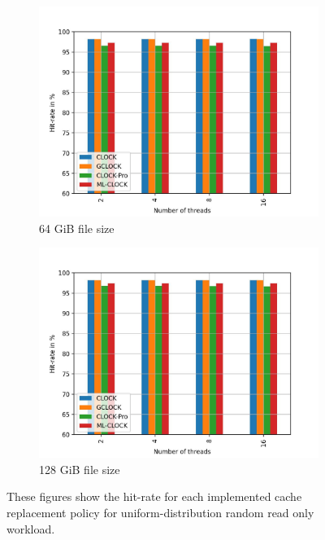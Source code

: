 \documentclass[
	12pt,
	a4paper,
	abstract,
	bibliography=totoc,
	chapterprefix,
	headings=openright,
	numbers=endperiod,
	parskip=half,
	twoside,
]{scrreprt}
\begin{document}
\begin{figure}[H]
\begin{subfigure}{0.4\textwidth}
	\end{subfigure}
	\hfill
	\begin{subfigure}{0.4\textwidth}
		\includegraphics[width=\textwidth]{multi_64_gb_randread_uniform.jpg}		
		\caption{64 GiB file size}
		\label{fig:rw_90to10  zoned}
	\end{subfigure}
	\hfill
	\begin{subfigure}{0.4\textwidth}
		\includegraphics[width=\textwidth]{multi_128_gb_randread_uniform.jpg}		
		\caption{128 GiB file size}
		\label{fig:rw_90to10  uniform}
	\end{subfigure}
	\caption{These figures show the hit-rate for each implemented cache replacement policy for uniform-distribution random read only workload.}
\end{figure}
\end{document}
